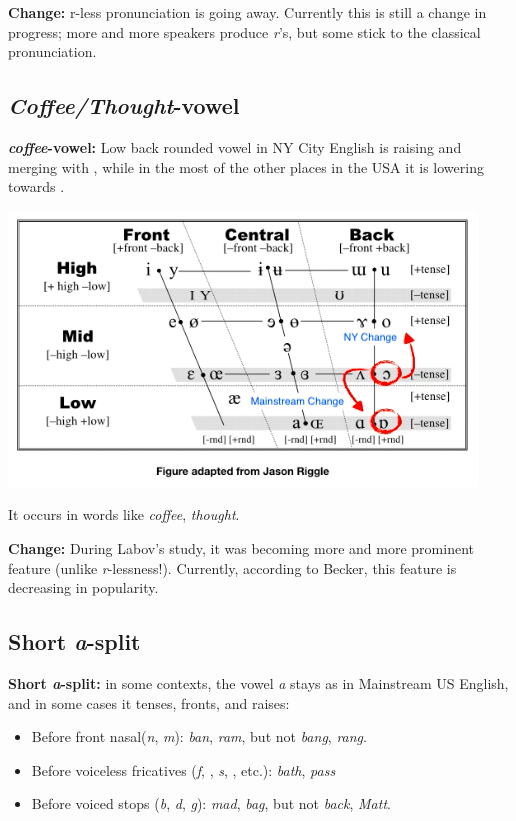 \documentclass[11pt]{article}
\newcommand{\1}{$'$}
\newcommand{\2}{$''$}
\newcommand{\3}{$'''$}
\begin{document}
\noindent \textbf{Change:} r-less pronunciation is going away. Currently this is still a change in progress; more and more speakers produce \emph{r}'s, but some stick to the classical pronunciation.

\subsection{\emph{Coffee/Thought}-vowel}

\textbf{\emph{coffee}-vowel:} Low back rounded vowel \textipa{[0]} in NY City English is raising and merging with \textipa{[o]}, while in the most of the other places in the USA it is lowering towards \textipa{[6]}.

\begin{center}
	\includegraphics[width=.7\textwidth]{coffee.png}	
\end{center}

	\noindent It occurs in words like \emph{coffee}, \emph{thought}.
	
\noindent \textbf{Change:} During Labov's study, it was becoming more and more prominent feature (unlike \emph{r}-lessness!). Currently, according to Becker, this feature is decreasing in popularity.

\subsection{Short \emph{a}-split}

\textbf{Short \emph{a}-split:} in some contexts, the vowel \emph{a} stays as in Mainstream US English, and in some cases it tenses, fronts, and raises:

	\begin{itemize}
		\item Before front nasal(\emph{n}, \emph{m}): \emph{ban}, \emph{ram}, but not \emph{bang}, \emph{rang}.
		\item Before voiceless fricatives (\emph{f}, \emph{}, \emph{s}, \emph{}, etc.): \emph{bath}, \emph{pass}
		\item Before voiced stops (\emph{b}, \emph{d}, \emph{g}): \emph{mad}, \emph{bag}, but not \emph{back}, \emph{Matt}.
	\end{itemize}
\end{document}
